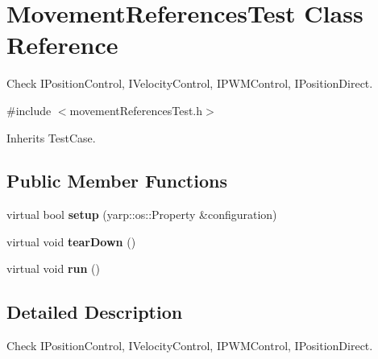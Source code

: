 \section{Movement\+References\+Test Class Reference}
\label{classMovementReferencesTest}


Check I\+Position\+Control, I\+Velocity\+Control, I\+P\+W\+M\+Control, I\+Position\+Direct.  




{\ttfamily \#include $<$movement\+References\+Test.\+h$>$}



Inherits Test\+Case.

\subsection*{Public Member Functions}
\begin{DoxyCompactItemize}
\item 
\mbox{\label{classMovementReferencesTest_ad9cc73f5b5865dec9d185bf4063e53a8}} 
virtual bool {\bfseries setup} (yarp\+::os\+::\+Property \&configuration)
\item 
\mbox{\label{classMovementReferencesTest_a593c8be2be3fe9bf79c7d0d7c5d817b9}} 
virtual void {\bfseries tear\+Down} ()
\item 
\mbox{\label{classMovementReferencesTest_afd727ad62714859a969e5b3c47959eca}} 
virtual void {\bfseries run} ()
\end{DoxyCompactItemize}


\subsection{Detailed Description}
Check I\+Position\+Control, I\+Velocity\+Control, I\+P\+W\+M\+Control, I\+Position\+Direct. 

